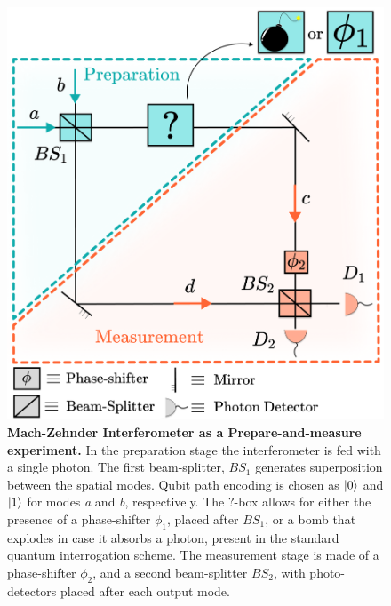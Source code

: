 \documentclass[a4paper,twocolumn,11pt,accepted=2024-01-17]{quantumarticle}
\begin{document}
\begin{figure}[tb]
    \centering
    \includegraphics[width=\columnwidth]{Acc_Figures/MZI_as_PM.png}
    \caption{\textbf{Mach-Zehnder Interferometer as a Prepare-and-measure experiment.} In the preparation stage the interferometer is fed with a single photon. The first beam-splitter, $BS_1$ generates superposition between the spatial modes. Qubit path encoding is chosen as $\ket{0}$ and $\ket{1}$ for modes \textit{a} and \textit{b}, respectively. The $?$-box allows for either the presence of a phase-shifter $\phi_1$, placed after $BS_1$, or a bomb that explodes in case it absorbs a photon, present in the standard quantum interrogation scheme. The measurement stage is made of a phase-shifter $\phi_2$, and a second beam-splitter $BS_2$, with photo-detectors placed after each output mode.}
    \label{fig:MZI}
\end{figure}
\end{document}
